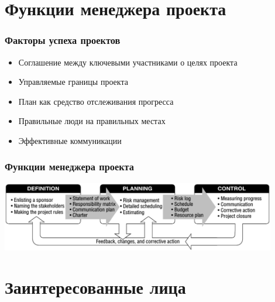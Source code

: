 \documentclass{../../slides-style}
\begin{document}
    \begin{frame}[plain]
        \titlepage
    \end{frame}

    \section{Функции менеджера проекта}

    \begin{frame}
        \frametitle{Факторы успеха проектов}
        \begin{itemize}
            \item Соглашение между ключевыми участниками о целях проекта
            \item Управляемые границы проекта
            \item План как средство отслеживания прогресса
            \item Правильные люди на правильных местах
            \item Эффективные коммуникации
        \end{itemize}
    \end{frame}

    \begin{frame}
        \frametitle{Функции менеджера проекта}
        \begin{center}
            \includegraphics[width=0.9\textwidth]{projectManagerFunctions.png}
        \end{center}
    \end{frame}

    \section{Заинтересованные лица}
\end{document}
